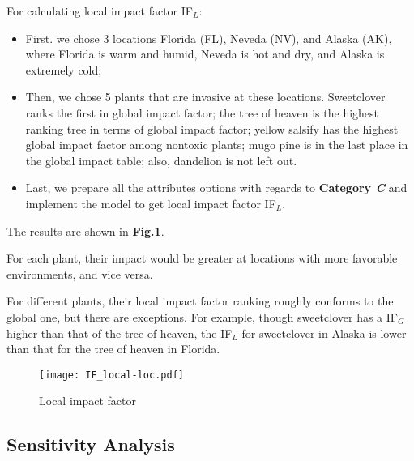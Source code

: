 \documentclass[12pt]{article}
\begin{document}
		For calculating local impact factor IF$_L$:
		\vspace{-0.2cm}
		\begin{itemize}
		\item First. we chose 3 locations Florida (FL), Neveda (NV), and Alaska (AK), where Florida is warm and humid, Neveda is hot and dry, and Alaska is extremely cold;
		\vspace{-0.2cm}
		\item Then, we chose 5 plants that are invasive at these locations.  Sweetclover ranks the first in global impact factor; the tree of heaven is the highest ranking tree in terms of global impact factor; yellow salsify has the highest global impact factor among nontoxic plants; mugo pine is in the last place in the global impact table; also, dandelion is not left out.
		\vspace{-0.2cm}
		\item Last, we prepare all the attributes options with regards to \textbf{Category \textit{C}} and implement the model to get local impact factor IF$_L$.
		\end{itemize} 	
		
		The results are shown in \textbf{Fig.\ref{fig:IFLocal}}.  
		
		For each plant, their impact would be greater at locations with more favorable environments, and vice versa.
		
		For different plants, their local impact factor ranking roughly conforms to the global one, but there are exceptions.  For example, though sweetclover has a IF$_G$ higher than that of the tree of heaven, the IF$_L$ for sweetclover in Alaska is lower than that for the tree of heaven in Florida.
		
		\begin{figure}[htbp]
			\centering
			\texttt{[image: IF\_local-loc.pdf]}
			\caption{Local impact factor}
			\label{fig:IFLocal}
		\end{figure}

	\newpage
	
	\subsection{Sensitivity Analysis}
	
\end{document}
